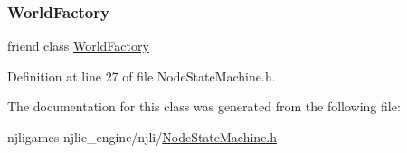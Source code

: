\subsubsection{\texorpdfstring{World\+Factory}{WorldFactory}}
{\footnotesize\ttfamily friend class \mbox{\hyperlink{classnjli_1_1_world_factory}{World\+Factory}}\hspace{0.3cm}{\ttfamily [friend]}}



Definition at line 27 of file Node\+State\+Machine.\+h.



The documentation for this class was generated from the following file\+:\begin{DoxyCompactItemize}
\item 
njligames-\/njlic\+\_\+engine/njli/\mbox{\hyperlink{_node_state_machine_8h}{Node\+State\+Machine.\+h}}\end{DoxyCompactItemize}
